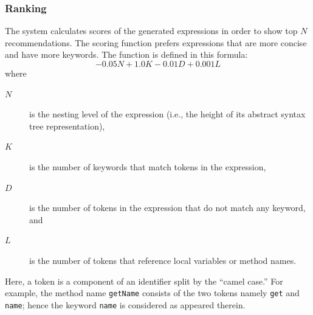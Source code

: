 \documentclass[PRO,english]{ipsj}
\begin{document}




\subsubsection{Ranking}
\label{subsubsection:Ranking}

The system calculates scores of the generated expressions in order to show top $N$ recommendations.  The scoring function prefers expressions that are more concise and have more keywords.  The function is defined in this formula:
$$
  - 0.05 N + 1.0 K  -0.01 D + 0.001 L
$$
where
\begin{description}
\item[$N$] is the nesting level of the expression (i.e., the height of its abstract syntax tree representation),
\item[$K$] is the number of keywords that match tokens in the expression,
\item[$D$] is the number of tokens in the expression that do not match any keyword, and
\item[$L$] is the number of tokens that reference local variables or method names.
\end{description}
Here, a token is a component of an identifier split by the ``camel case.''  For example, the method name \texttt{getName} consists of the two tokens namely \texttt{get} and \texttt{name}; hence the keyword \texttt{name} is considered as appeared therein.
\end{document}
